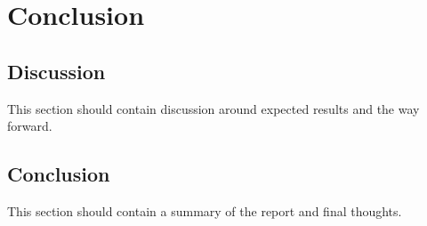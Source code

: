 \chapter{Conclusion} %

\label{Chapter5}



\section{Discussion}

This section should contain discussion around expected results and the way forward.


\section{Conclusion}

This section should contain a summary of the report and final thoughts.